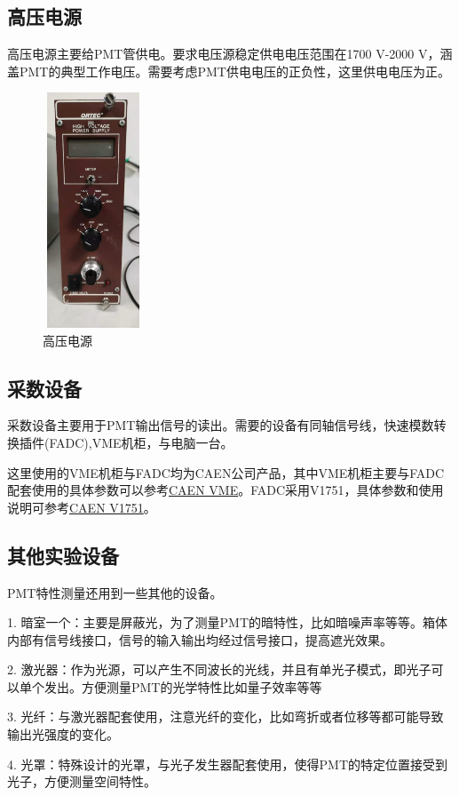 \documentclass[UTF8,a4paper,12pt]{ctexart}
\begin{document}
\subsection{高压电源} 
高压电源主要给PMT管供电。要求电压源稳定供电电压范围在1700 V-2000 V，涵盖PMT的典型工作电压。需要考虑PMT供电电压的正负性，这里供电电压为正。
\begin{figure}[H]
	\centering
	\includegraphics[width=3cm,height=7cm]{高压电源}
	\caption[图3]{高压电源}
\end{figure}

\subsection{采数设备}
采数设备主要用于PMT输出信号的读出。需要的设备有同轴信号线，快速模数转换插件(FADC),VME机柜，与电脑一台。\par
这里使用的VME机柜与FADC均为CAEN公司产品，其中VME机柜主要与FADC配套使用的具体参数可以参考\href{https://www.caen.it/search/VME}{CAEN VME}。FADC采用V1751，具体参数和使用说明可参考\href{https://www.caen.it/products/v1751/}{CAEN V1751}。

\subsection{其他实验设备}
PMT特性测量还用到一些其他的设备。\par
1. 暗室一个：主要是屏蔽光，为了测量PMT的暗特性，比如暗噪声率等等。箱体内部有信号线接口，信号的输入输出均经过信号接口，提高遮光效果。\par
2. 激光器：作为光源，可以产生不同波长的光线，并且有单光子模式，即光子可以单个发出。方便测量PMT的光学特性比如量子效率等等\par
3. 光纤：与激光器配套使用，注意光纤的变化，比如弯折或者位移等都可能导致输出光强度的变化。\par
4. 光罩：特殊设计的光罩，与光子发生器配套使用，使得PMT的特定位置接受到光子，方便测量空间特性。\par
\end{document}
